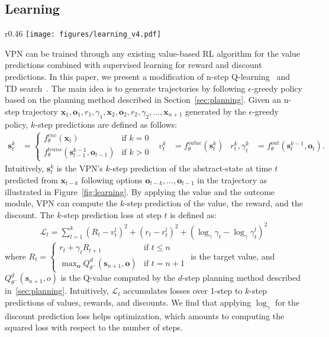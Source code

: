 \documentclass{article}
\newcommand{\option}{o}
\newcommand{\cutsubsectionup}{\vspace*{-0.04in}}
\newcommand{\cutsubsectiondown}{\vspace*{-0.03in}}
\begin{document}
\cutsubsectionup
\subsection{Learning} \label{sec:learning}
\cutsubsectiondown
\begin{wrapfigure}{r}{0.46\textwidth}
    \vspace{-10pt}
    \centering
\texttt{[image: figures/learning\_v4.pdf]}
	\caption{Illustration of learning process. } 
	\label{fig:learning}	
	\vspace{-5pt}
\end{wrapfigure}
VPN can be trained through any existing value-based RL algorithm for the value predictions combined with supervised learning for reward and discount predictions. In this paper, we present a modification of n-step Q-learning~\citep{mnih2016asynchronous} and TD search~\citep{Silver2012TemporaldifferenceSI}. The main idea is to generate trajectories by following $\epsilon$-greedy policy based on the planning method described in Section~\ref{sec:planning}. 
Given an n-step trajectory $\textbf{x}_1,\textbf{\option{}}_1,r_1,\gamma_1,\textbf{x}_2,\textbf{\option{}}_2,r_2,\gamma_2,...,\textbf{x}_{n+1}$ generated by the $\epsilon$-greedy policy, $k$-step predictions are defined as follows:
\begin{align*}
\textbf{s}^{k}_t & = \begin{cases}
f^{enc}_\theta(\textbf{x}_t) & \mbox{if }k=0 \\
f^{trans}_\theta(\textbf{s}^{k-1}_{t-1}, \textbf{\option{}}_{t-1}) & \mbox{if } k>0 
\end{cases} 
&
v^{k}_t & = f^{value}_\theta(\textbf{s}^k_t)
&
r^{k}_t,\gamma^{k}_t & = f^{out}_\theta(\textbf{s}^{k-1}_t, \textbf{\option{}}_{t}).
\end{align*}
Intuitively, $\textbf{s}^k_t$ is the VPN's $k$-step prediction of the abstract-state at time $t$ predicted from $\textbf{x}_{t-k}$ following options $\textbf{\option{}}_{t-k},...,\textbf{\option{}}_{t-1}$ in the trajectory as illustrated in Figure~\ref{fig:learning}. By applying the value and the outcome module, VPN can compute the $k$-step prediction of the value, the reward, and the discount. The $k$-step prediction loss at step $t$ is defined as:
\begin{align*}
\mathcal{L}_t =\sum_{l=1}^{k}\left(R_t-v^l_t\right)^2+\left(r_t-r^l_t\right)^2+\left(\log_\gamma\gamma_t-\log_\gamma\gamma^l_t\right)^2
\label{eq:loss}
\end{align*}
where $R_t = \begin{cases} 
r_t + \gamma_t R_{t+1} & \mbox{if } t \le n \\
\max_\textbf{\option{}} Q^{d}_{\theta^-}(\textbf{s}_{n+1},\textbf{\option{}}) & \mbox {if } t = n+1
\end{cases}$ is the target value, and $Q^{d}_{\theta^-}(\textbf{s}_{n+1},\option{})$ is the Q-value computed by the $d$-step planning method described in~\ref{sec:planning}. Intuitively, $\mathcal{L}_t$ accumulates losses over 1-step to $k$-step predictions of values, rewards, and discounts. We find that applying $\log_\gamma$ for the discount prediction loss helps optimization, which amounts to computing the squared loss with respect to the number of steps. 
\end{document}
